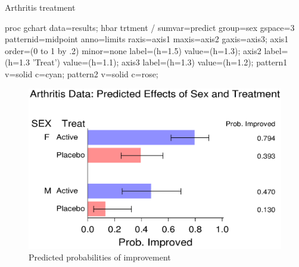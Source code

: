 \begin{Example}[arthrit9]{Arthritis treatment}
\begin{listing}
proc gchart data=results;
   hbar trtment / sumvar=predict group=sex gspace=3
                  patternid=midpoint
                  anno=limits
                  raxis=axis1
                  maxis=axis2
                  gaxis=axis3;
   axis1 order=(0 to 1 by .2) minor=none
         label=(h=1.5) value=(h=1.3);
   axis2 label=(h=1.3 'Treat') value=(h=1.1);
   axis3 label=(h=1.3) value=(h=1.2);
   pattern1 v=solid c=cyan;
   pattern2 v=solid c=rose;
\end{listing}
\begin{figure}[!htb]
  \centering
  \includegraphics[scale=.7,clip]{ch6/fig/glogist0}
  \caption{Predicted probabilities of improvement}\label{fig:glogist0}
\end{figure}


\end{Example}
